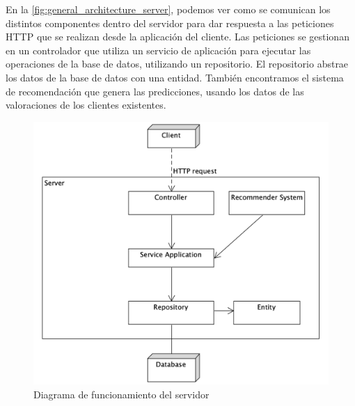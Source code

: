  En la \autoref{fig:general_architecture_server}, podemos ver como se comunican
 los distintos componentes dentro del servidor para dar respuesta a las peticiones
 HTTP que se realizan desde la aplicación del cliente.
Las peticiones se gestionan en un controlador que utiliza un servicio de
 aplicación para ejecutar las operaciones de la base de datos, utilizando un
 repositorio. El repositorio abstrae los datos de la base de datos con una
 entidad. También encontramos el sistema de recomendación que genera las
 predicciones, usando los datos de las valoraciones de los clientes existentes. 
\begin{figure}[H]
    \centering
    \includegraphics[width=6in]{figures/chapter-4/general_server_architecture.png}
    \caption{Diagrama de funcionamiento del servidor}
    \label{fig:general_architecture_server}
\end{figure}
